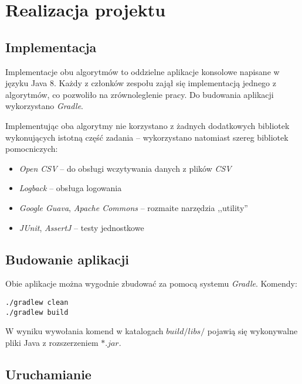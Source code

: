 \section{Realizacja projektu}

\subsection{Implementacja}

Implementacje obu algorytmów to oddzielne aplikacje konsolowe napisane w języku Java 8. Każdy z członków zespołu zajął się implementacją jednego z algorytmów, co pozwoliło na zrównoleglenie pracy. Do budowania aplikacji wykorzystano \emph{Gradle}.

Implementując oba algorytmy nie korzystano z żadnych dodatkowych bibliotek wykonujących istotną część zadania -- wykorzystano natomiast szereg bibliotek pomocniczych:

\begin{itemize}
	\item \emph{Open CSV} -- do obsługi wczytywania danych z plików \emph{CSV}
	\item \emph{Logback} -- obsługa logowania
	\item \emph{Google Guava}, \emph{Apache Commons} -- rozmaite narzędzia ,,utility''
	\item \emph{JUnit}, \emph{AssertJ} -- testy jednostkowe
\end{itemize}

\subsection{Budowanie aplikacji}

Obie aplikacje można wygodnie zbudować za pomocą systemu \emph{Gradle}. Komendy:
\begin{lstlisting}
./gradlew clean
./gradlew build
\end{lstlisting}

W wyniku wywołania komend w katalogach $build/libs/$ pojawią się wykonywalne pliki Java z rozszerzeniem $*.jar$.

\subsection{Uruchamianie}

